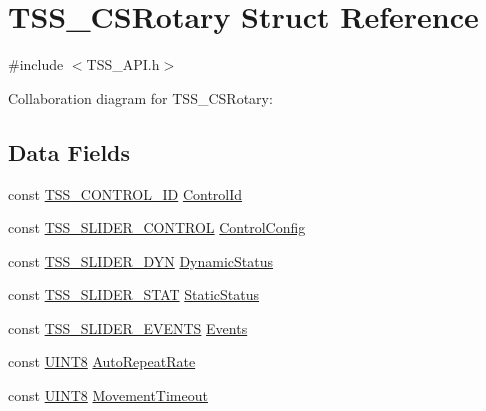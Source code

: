 \hypertarget{struct_t_s_s___c_s_rotary}{}\section{T\+S\+S\+\_\+\+C\+S\+Rotary Struct Reference}
\label{struct_t_s_s___c_s_rotary}


{\ttfamily \#include $<$T\+S\+S\+\_\+\+A\+P\+I.\+h$>$}



Collaboration diagram for T\+S\+S\+\_\+\+C\+S\+Rotary\+:
\subsection*{Data Fields}
\begin{DoxyCompactItemize}
\item 
const \hyperlink{struct_t_s_s___c_o_n_t_r_o_l___i_d}{T\+S\+S\+\_\+\+C\+O\+N\+T\+R\+O\+L\+\_\+\+ID} \hyperlink{struct_t_s_s___c_s_rotary_afcbd53ab3bcf97cfd8d0a8b45863e11a}{Control\+Id}
\item 
const \hyperlink{struct_t_s_s___s_l_i_d_e_r___c_o_n_t_r_o_l}{T\+S\+S\+\_\+\+S\+L\+I\+D\+E\+R\+\_\+\+C\+O\+N\+T\+R\+OL} \hyperlink{struct_t_s_s___c_s_rotary_a6d07df502e32961140b4794be630137b}{Control\+Config}
\item 
const \hyperlink{struct_t_s_s___s_l_i_d_e_r___d_y_n}{T\+S\+S\+\_\+\+S\+L\+I\+D\+E\+R\+\_\+\+D\+YN} \hyperlink{struct_t_s_s___c_s_rotary_a758ddd4ded2812f055c8f8ea42ee535c}{Dynamic\+Status}
\item 
const \hyperlink{struct_t_s_s___s_l_i_d_e_r___s_t_a_t}{T\+S\+S\+\_\+\+S\+L\+I\+D\+E\+R\+\_\+\+S\+T\+AT} \hyperlink{struct_t_s_s___c_s_rotary_a095e6eb920491a2526b8678a3d6f7124}{Static\+Status}
\item 
const \hyperlink{struct_t_s_s___s_l_i_d_e_r___e_v_e_n_t_s}{T\+S\+S\+\_\+\+S\+L\+I\+D\+E\+R\+\_\+\+E\+V\+E\+N\+TS} \hyperlink{struct_t_s_s___c_s_rotary_a6a67c9e8b9b2a0934ae230baff75b66b}{Events}
\item 
const \hyperlink{_t_s_s___data_types_8h_ab27e9918b538ce9d8ca692479b375b6a}{U\+I\+N\+T8} \hyperlink{struct_t_s_s___c_s_rotary_aef1117c410a59acb56f45d9674e0dd56}{Auto\+Repeat\+Rate}
\item 
const \hyperlink{_t_s_s___data_types_8h_ab27e9918b538ce9d8ca692479b375b6a}{U\+I\+N\+T8} \hyperlink{struct_t_s_s___c_s_rotary_ad3e98b5d97454837cd6293b7abffbe9f}{Movement\+Timeout}
\end{DoxyCompactItemize}


